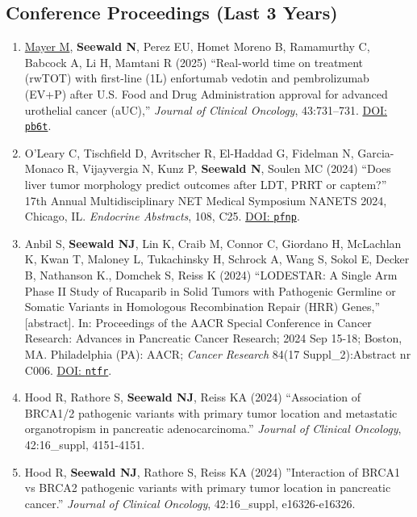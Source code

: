 \documentclass[letterpaper,11pt]{article} %
\begin{document}
 	\subsection*{Conference Proceedings (Last 3 Years)}
 	\begin{enumerate}
        
        \item \underline{Mayer M}, \textbf{Seewald N}, Perez EU, Homet Moreno B, Ramamurthy C, Babcock A, Li H, Mamtani R (2025) ``Real-world time on treatment (rwTOT) with first-line (1L) enfortumab vedotin and pembrolizumab (EV+P) after U.S. Food and Drug Administration approval for advanced urothelial cancer (aUC),'' \textit{Journal of Clinical Oncology}, 43:731–731. \href{https://doi.org/pb6t}{DOI: \texttt{pb6t}}.

        \item O'Leary C, Tischfield D, Avritscher R, El-Haddad G, Fidelman N, Garcia-Monaco R, Vijayvergia N, Kunz P, \textbf{Seewald N}, Soulen MC (2024) ``Does liver tumor morphology predict outcomes after LDT, PRRT or captem?'' 17th Annual Multidisciplinary NET Medical Symposium NANETS 2024, Chicago, IL. \textit{Endocrine Abstracts}, 108, C25. \href{https://doi.org/pfnp}{DOI: \texttt{pfnp}}.
    
 		\item Anbil S, \textbf{Seewald NJ}, Lin K, Craib M, Connor C, Giordano H, McLachlan K, Kwan T, Maloney L, Tukachinsky H, Schrock A, Wang S, Sokol E, Decker B, Nathanson K., Domchek S, Reiss K (2024) ``LODESTAR: A Single Arm Phase II Study of Rucaparib in Solid Tumors with Pathogenic Germline or Somatic Variants in Homologous Recombination Repair (HRR) Genes,'' [abstract]. In: Proceedings of the AACR Special Conference in Cancer Research: Advances in Pancreatic Cancer Research; 2024 Sep 15-18; Boston, MA. Philadelphia (PA): AACR; \textit{Cancer Research} 84(17 Suppl\_2):Abstract nr C006. \href{https://doi.org/ntfr}{DOI: \texttt{ntfr}}.

        \item Hood R, Rathore S, \textbf{Seewald NJ}, Reiss KA (2024) ``Association of BRCA1/2 pathogenic variants with primary tumor location and metastatic organotropism in pancreatic adenocarcinoma.'' \textit{Journal of Clinical Oncology}, 42:16\_suppl, 4151-4151.

        \item Hood R, \textbf{Seewald NJ}, Rathore S, Reiss KA (2024) ''Interaction of BRCA1 vs BRCA2 pathogenic variants with primary tumor location in pancreatic cancer.'' \textit{Journal of Clinical Oncology}, 42:16\_suppl, e16326-e16326.
        

\end{enumerate}
\end{document}
